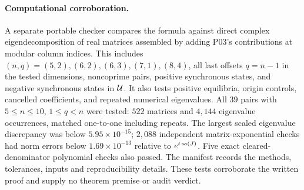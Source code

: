 \paragraph{Computational corroboration.}
A separate portable checker compares the formula against direct
complex eigendecomposition of real matrices assembled by adding
P03's contributions at modular column indices. This includes
$(n,q)=(5,2),(6,2),(6,3),(7,1),(8,4)$, all last offsets $q=n-1$
in the tested dimensions, noncoprime pairs, positive synchronous
states, and negative synchronous states in $\mathcal{U}$. It also tests
positive equilibria, origin controls, cancelled coefficients, and
repeated numerical eigenvalues. All $39$ pairs with $5\le n\le10$,
$1\le q<n$ were tested: $522$ matrices and $4{,}144$ eigenvalue
occurrences, matched one-to-one including repeats. The largest
scaled eigenvalue discrepancy was below $5.95\times10^{-15}$;
$2{,}088$ independent matrix-exponential checks had norm errors below
$1.69\times10^{-13}$ relative to $e^{t\operatorname{sa}(J)}$. Five exact
cleared-denominator polynomial checks also passed. The manifest
records the methods, tolerances, inputs and reproducibility details.
These tests corroborate the written proof and supply no theorem
premise or audit verdict.

